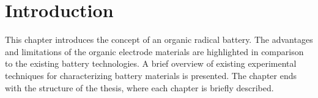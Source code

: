 \chapter{Introduction}
This chapter introduces the concept of an organic radical battery. The advantages and limitations of the organic electrode materials are highlighted in comparison to the existing battery technologies. A brief overview of existing experimental techniques for characterizing battery materials is presented. The chapter ends with the structure of the thesis, where each chapter is briefly described.

%
%

